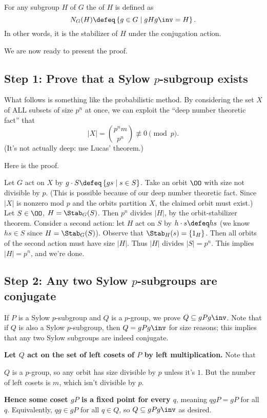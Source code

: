 \begin{definition}
	For any subgroup $H$ of $G$ the  of $H$ is defined as
	\[ N_G(H) \defeq \left\{ g \in G \mid gHg\inv = H \right\}. \]
	In other words, it is the stabilizer of $H$ under the conjugation action.
\end{definition}

We are now ready to present the proof.

\subsection{Step 1: Prove that a Sylow $p$-subgroup exists}
What follows is something like the probabilistic method.
By considering the set $X$ of ALL subsets of size $p^n$ at once, we can exploit the ``deep number theoretic fact'' that
\[ \left\lvert X \right\rvert = \binom{p^n m}{p^n} \not\equiv 0 \pmod p. \]
(It's not actually deep: use Lucas' theorem.)

Here is the proof.
\begin{itemize}
	\ii Let $G$ act on $X$ by $g \cdot S \defeq \left\{ gs \mid s \in S \right\}$.
	\ii Take an orbit $\OO$ with size not divisible by $p$.
	(This is possible because of our deep number theoretic fact.
	Since $\left\lvert X \right\rvert$ is nonzero mod $p$ and the orbits partition $X$,
	the claimed orbit must exist.)
	\ii Let $S \in \OO$, $H = \Stab_G(S)$.
	Then $p^n$ divides $\left\lvert H \right\rvert$, by the orbit-stabilizer theorem.
	\ii Consider a second action: let $H$ act on $S$ by
	$h \cdot s \defeq hs$ (we know $hs \in S$ since $H = \Stab_G(S)$).
	\ii
	Observe that $\Stab_H(s) = \{1_H\}$.
	Then all orbits of the second action must have size $\left\lvert H \right\rvert$. Thus $\left\lvert H \right\rvert$ divides $\left\lvert S \right\rvert = p^n$.
	\ii This implies $\left\lvert H \right\rvert = p^n$, and we're done.
\end{itemize}


\subsection{Step 2: Any two Sylow $p$-subgroups are conjugate}
If $P$ is a Sylow $p$-subgroup and $Q$ is a $p$-group, we prove $Q
\subseteq gPg\inv$. Note that if $Q$ is also a Sylow $p$-subgroup, then
$Q = gPg\inv$ for size reasons; this implies that any two Sylow
subgroups are indeed conjugate.

\textbf{Let $Q$ act on the set of left cosets of $P$ by left multiplication.}
Note that
\begin{itemize}
	\ii $Q$ is a $p$-group, so any orbit has size divisible by $p$ unless it's $1$.
	\ii But the number of left cosets is $m$, which isn't divisible by $p$.
\end{itemize}
\textbf{Hence some coset $gP$ is a fixed point for every $q$}, meaning
$qgP = gP$ for all $q$.
Equivalently, $qg \in gP$ for all $q \in Q$, so $Q \subseteq gPg\inv$ as desired.


